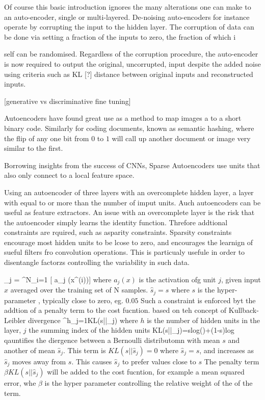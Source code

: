 Of course this basic introduction ignores the many alterations one can make to an auto-encoder, single or multi-layered.
De-noising auto-encoders for instance operate by corrupting the input to the hidden layer. 
The corruption of data can be done via setting a fraction of the inputs to zero, the fraction of which i




self can be randomised.
Regardless of the corruption procedure, the auto-encoder is now required to output the original, uncorrupted, input despite the added noise using criteria such as KL [?] distance between original inputs and reconstructed inputs.

[generative vs discriminative fine tuning]\citep{mo2012survey}


Autoencoders have found great use as a method to map images a to a short binary code.
Similarly for coding documents, known as semantic hashing, where the flip of any one bit from $0$ to $1$ will call up another document or image very similar to the first.


Borrowing insights from the success of CNNs, Sparse Autoencoders use units that also only connect to a local feature space\citep{bengio2009advances}.

Using an autoencoder of three layers with an overcomplete hidden layer, a layer with equal to or more than the number of imput units.
Auch autoencoders can be useful as feature extractors\citep{payan2015predicting}.
An issue with an overcomplete layer is the risk that the autoencoder simply learns the identity function\citep{bengio2012practical}.
Threfore addtional constraints are rquired, such as asparity constraints\citep{poultney2006efficient}.
Sparsity constraints encourage most hidden units to be lcose to zero, and encourages the learnign of sueful filters fro convolution operations.
This is particualy usefule in order to disentangle factorzs controlling the variability in such data.

\be
{}_j = \sum^N_{i=1} [ a_j (x^{(i)})]
\ee
where $a_j(x)$ is the activation ofg unit $j$, given input $x$ averaged over the training set of N samples.
$\hat{s}_j =s$ where $s$ is the hyper-parameter , typically close to zero, eg. $0.05$
Such a constraint is enforced byt the addtion of a penalty term to the cost fucntion. based on teh concept of Kullback-Leibler divergence
\be
\sum^h_{j=1}KL(s||_j)
\ee
where $h$ is the number of hidden units in the layer, $j$ the summing index of the hidden units
\be
KL(s||_j)=slog()+(1-s)log 
\ee
qauntifies the diergence between a Bernoulli distributomn with mean $s$ and another of mean $\hat{s}_j$.
This term is $KL(s||\hat{s}_j)=0$ where $\hat{s}_j=s$, and increases as $\hat{s}_j$ moves away from $s$.
This causes $\hat{s}_j$ to prefer values close to $s$
The penalty term $\beta KL(s||\hat{s}_j)$ will be added to the cost fucntion, for example a mean squared error, whe $\beta$ is the hyper parameter controlling the relative weight of the of the term\citep{payan2015predicting}.




